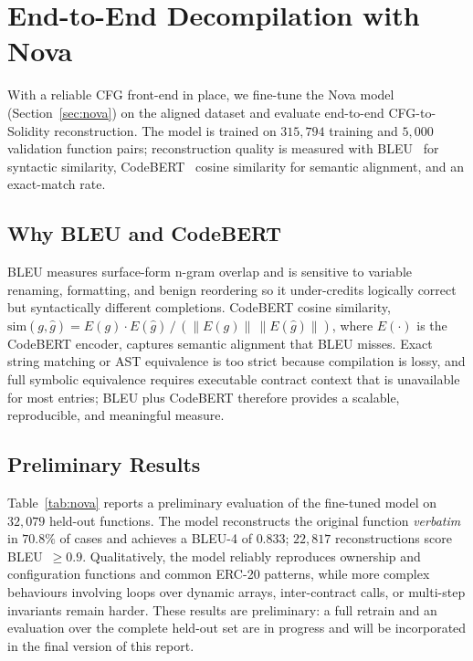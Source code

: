 \documentclass{article}
\begin{document}
\section{End-to-End Decompilation with Nova}
\label{sec:nova-eval}

With a reliable CFG front-end in place, we fine-tune the Nova model
(Section~\ref{sec:nova}) on the aligned dataset and evaluate end-to-end
CFG-to-Solidity reconstruction. The model is trained on $315{,}794$ training and
$5{,}000$ validation function pairs; reconstruction quality is measured with
BLEU~\cite{papineni2002bleu} for syntactic similarity, CodeBERT~\cite{feng2020codebert}
cosine similarity for semantic alignment, and an exact-match rate.

\subsection{Why BLEU and CodeBERT}
BLEU measures surface-form n-gram overlap and is sensitive to variable renaming,
formatting, and benign reordering so it under-credits logically correct but
syntactically different completions. CodeBERT cosine similarity,
$\text{sim}(g,\hat{g}) = E(g)\!\cdot\! E(\hat{g}) \,/\, (\lVert E(g)\rVert\,\lVert E(\hat{g})\rVert)$,
where $E(\cdot)$ is the CodeBERT encoder, captures semantic alignment that BLEU
misses. Exact string matching or AST equivalence is too strict because compilation
is lossy, and full symbolic equivalence requires executable contract context that
is unavailable for most entries; BLEU plus CodeBERT therefore provides a scalable,
reproducible, and meaningful measure.

\subsection{Preliminary Results}
Table~\ref{tab:nova} reports a preliminary evaluation of the fine-tuned model on
$32{,}079$ held-out functions. The model reconstructs the original function
\emph{verbatim} in $70.8\%$ of cases and achieves a BLEU-4 of $0.833$; $22{,}817$
reconstructions score BLEU~$\geq 0.9$. Qualitatively, the model reliably reproduces
ownership and configuration functions and common ERC-20 patterns, while more
complex behaviours involving loops over dynamic arrays, inter-contract calls, or
multi-step invariants remain harder. These results are preliminary: a full retrain
and an evaluation over the complete held-out set are in progress and will be
incorporated in the final version of this report.
\end{document}
